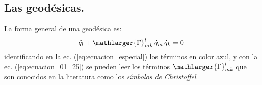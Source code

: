 \subsection{Las geodésicas.}

La forma general de una geodésica es:
\begin{align}
\ddot{q}_{l} + \mathlarger{\Gamma}_{mk}^{l} \, \dot{q}_{m} \, \dot{q}_{k} = 0
\label{eq:ecuacion_01_25}
\end{align}
identificando en la ec. (\ref{eq:ecuacion_especial}) los términos en color azul, y con la ec. (\ref{eq:ecuacion_01_25}) se pueden leer los términos $\mathlarger{\Gamma}_{mk}^{l}$ que son conocidos en la literatura como los \emph{símbolos de Christoffel}.

